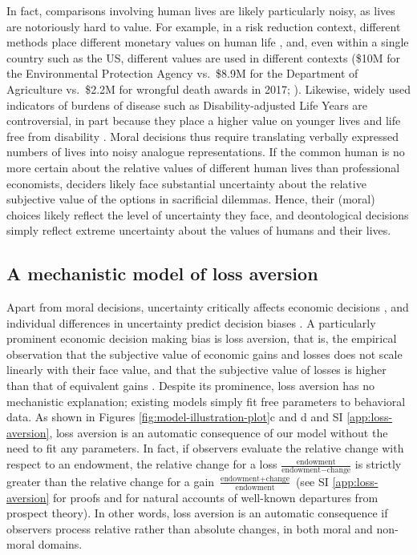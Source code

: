 \documentclass[
]{article}
\begin{document}
In fact, comparisons involving human lives are likely particularly noisy, as lives are notoriously hard to value. For example, in a risk reduction context, different methods place different monetary values on human life \autocite{Viscusi2003}, and, even within a single country such as the US, different values are used in different contexts (\$10M for the Environmental Protection Agency vs.~\$8.9M for the Department of Agriculture vs.~\$2.2M for wrongful death awards in 2017; \autocite{Merrill2017}). Likewise, widely used indicators of burdens of disease such as Disability-adjusted Life Years are controversial, in part because they place a higher value on younger lives and life free from disability \autocite{Gold2002}. Moral decisions thus require translating verbally expressed numbers of lives into noisy analogue representations. If the common human is no more certain about the relative values of different human lives than professional economists, deciders likely face substantial uncertainty about the relative subjective value of the options in sacrificial dilemmas. Hence, their (moral) choices likely reflect the level of uncertainty they face, and deontological decisions simply reflect extreme uncertainty about the values of humans and their lives.

\subsection{A mechanistic model of loss aversion}\label{a-mechanistic-model-of-loss-aversion}

Apart from moral decisions, uncertainty critically affects economic decisions \autocite{Kahneman1979}, and individual differences in uncertainty predict decision biases \autocite{BarrettoGarcia2023,Khaw2020}. A particularly prominent economic decision making bias is loss aversion, that is, the empirical observation that the subjective value of economic gains and losses does not scale linearly with their face value, and that the subjective value of losses is higher than that of equivalent gains \autocite{Tversky1992,Yechiam2013}. Despite its prominence, loss aversion has no mechanistic explanation; existing models simply fit free parameters to behavioral data. As shown in Figures \ref{fig:model-illustration-plot}c and d and SI \ref{app:loss-aversion}, loss aversion is an automatic consequence of our model without the need to fit any parameters. In fact, if observers evaluate the relative change with respect to an endowment, the relative change for a loss \(\frac{\text{endowment}}{\text{endowment} - \text{change}}\) is strictly greater than the relative change for a gain \(\frac{\text{endowment} + \text{change}}{\text{endowment}}\) (see SI \ref{app:loss-aversion} for proofs and for natural accounts of well-known departures from prospect theory). In other words, loss aversion is an automatic consequence if observers process relative rather than absolute changes, in both moral and non-moral domains.
\end{document}

